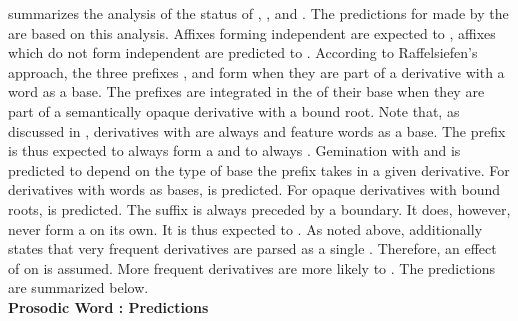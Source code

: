  summarizes the analysis of the  status of  , ,  and . The predictions for  made by the  are based on this analysis. Affixes forming independent  are expected to , affixes which do not form independent  are predicted to .
According to Raffelsiefen's approach, the three prefixes ,  and  form  when they are part of a  derivative with a word as a base. The prefixes are integrated in the  of their base when they are part of a semantically opaque derivative with a bound root. 
Note that, as discussed in , derivatives with  are always  and feature words as a base. The prefix  is thus expected to always form a  and to always . 
Gemination with  and  is predicted to depend on the type of base the prefix takes in a given derivative. For  derivatives with words as bases,  is predicted. For opaque derivatives with bound roots,  is predicted.
The suffix  is always preceded by a  boundary. It does, however, never form a  on its own. It is thus expected to . 
As noted above, \cite{Raffelsiefen.1999} additionally states that very frequent derivatives are parsed as a single . Therefore, an effect of  on  is assumed. More frequent derivatives are more likely to . The predictions are summarized below.\\



\textbf{Prosodic Word \citep{Raffelsiefen.1999}: Predictions}

